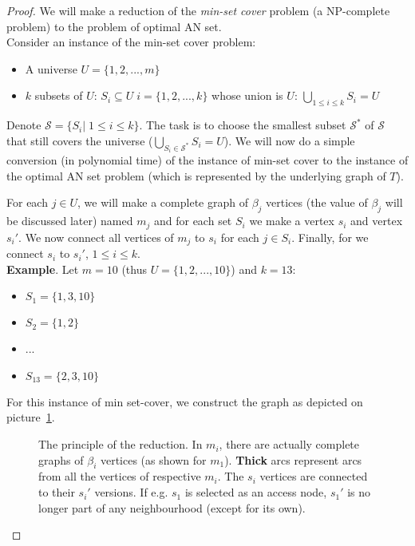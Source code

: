 		\begin{proof}
			We will make a reduction of the \textit{min-set cover} problem (a NP-complete problem) to the problem of optimal AN set. \\
			
			\noindent Consider an instance of the min-set cover problem:
			\begin{itemize}
				\item A universe $U = \{1, 2, ..., m\}$
				\item $k$ subsets of $U$: $S_{i} \subseteq U \; i = \{1, 2, ..., k\}$ whose union is $U$: $\bigcup\limits_{1 \leq i \leq k} S_{i} = U$
			\end{itemize}
			\hspace*{\fill}
			
			\noindent Denote $\mathcal{S} = \{S_{i}| \; 1 \leq i \leq k\}$. The task is to choose the smallest subset $\mathcal{S}^{*}$ of $\mathcal{S}$ that still covers the universe ($\bigcup\limits_{S_{i} \in \mathcal{S}^{*}} S_{i} = U$). We will now do a simple conversion (in polynomial time) of the instance of min-set cover to the instance of the optimal AN set problem (which is represented by the underlying graph of $T$).
			
			 For each $j \in U$, we will make a complete graph of $\beta_{j}$ vertices (the value of $\beta_{j}$ will be discussed later) named $m_{j}$ and for each set $S_{i}$ we make a vertex $s_{i}$ and vertex $s_{i}'$. We now connect all vertices of $m_{j}$ to $s_{i}$ for each $j \in S_{i}$. Finally, for we connect $s_{i}$ to $s_{i}'$, $1 \leq i \leq k$. \\
			 
			\noindent \textbf{Example}. Let $m = 10$ (thus $U = \{1, 2, ..., 10\}$) and $k = 13$:
			\begin{itemize}
				\item $S_{1} = \{1, 3, 10\}$
			 	\item $S_{2} = \{1, 2\}$
			 	\item ...
			 	\item $S_{13} = \{2, 3, 10\}$
			\end{itemize}
			\hspace*{\fill}
			 
			\noindent For this instance of min set-cover, we construct the graph as depicted on picture~\ref{fig:reduction}.
			 
			\begin{figure}[h!]
				\begin{center}
				\end{center}
				\caption{\label{fig:reduction} The principle of the reduction. In $m_{i}$, there are actually complete graphs of $\beta_{i}$ vertices (as shown for $m_{1}$). \textbf{Thick} arcs represent arcs from all the vertices of respective $m_{i}$. The $s_{i}$ vertices are connected to their $s_{i}'$ versions. If e.g. $s_{1}$ is selected as an access node, $s_{1}'$ is no longer part of any neighbourhood (except for its own).}
			\end{figure}
			

\end{proof}
